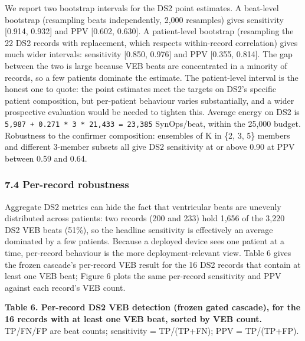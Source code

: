 \documentclass[
]{article}
\begin{document}
We report two bootstrap intervals for the DS2 point estimates. A
beat-level bootstrap (resampling beats independently, 2,000 resamples)
gives sensitivity {[}0.914, 0.932{]} and PPV {[}0.602, 0.630{]}. A
patient-level bootstrap (resampling the 22 DS2 records with replacement,
which respects within-record correlation) gives much wider intervals:
sensitivity {[}0.850, 0.976{]} and PPV {[}0.355, 0.814{]}. The gap
between the two is large because VEB beats are concentrated in a
minority of records, so a few patients dominate the estimate. The
patient-level interval is the honest one to quote: the point estimates
meet the targets on DS2's specific patient composition, but per-patient
behaviour varies substantially, and a wider prospective evaluation would
be needed to tighten this. Average energy on DS2 is
\texttt{5,987\ +\ 0.271\ *\ 3\ *\ 21,433\ =\ 23,385} SynOps/beat, within
the 25,000 budget. Robustness to the confirmer composition: ensembles of
K in \{2, 3, 5\} members and different 3-member subsets all give DS2
sensitivity at or above 0.90 at PPV between 0.59 and 0.64.

\subsubsection{7.4 Per-record robustness}\label{per-record-robustness}

Aggregate DS2 metrics can hide the fact that ventricular beats are
unevenly distributed across patients: two records (200 and 233) hold
1,656 of the 3,220 DS2 VEB beats (51\%), so the headline sensitivity is
effectively an average dominated by a few patients. Because a deployed
device sees one patient at a time, per-record behaviour is the more
deployment-relevant view. Table 6 gives the frozen cascade's per-record
VEB result for the 16 DS2 records that contain at least one VEB beat;
Figure 6 plots the same per-record sensitivity and PPV against each
record's VEB count.

\textbf{Table 6. Per-record DS2 VEB detection (frozen gated cascade),
for the 16 records with at least one VEB beat, sorted by VEB count.}
TP/FN/FP are beat counts; sensitivity = TP/(TP+FN); PPV = TP/(TP+FP).
\end{document}
